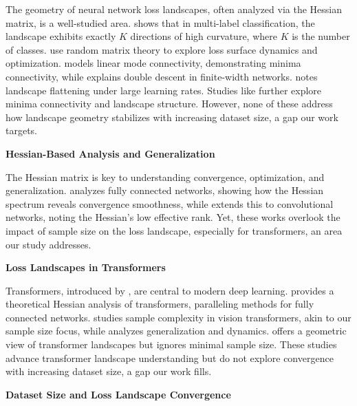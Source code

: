 \documentclass{article}
\begin{document}
The geometry of neural network loss landscapes, often analyzed via the Hessian matrix, is a well-studied area. \cite{fort2019emergentpropertieslocalgeometry} shows that in multi-label classification, the landscape exhibits exactly $K$ directions of high curvature, where $K$ is the number of classes. \cite{pmlr-v70-pennington17a} use random matrix theory to explore loss surface dynamics and optimization. \cite{garipov2018losssurfacesmodeconnectivity} models linear mode connectivity, demonstrating minima connectivity, while \cite{singh2022phenomenologydoubledescentfinitewidth} explains double descent in finite-width networks. \cite{wang2023instabilitieslargelearningrate} notes landscape flattening under large learning rates. Studies like \cite{draxler2019essentiallynobarriers, garipov2018losssurfacesmodeconnectivity, nguyen2017losssurfacedeepwide} further explore minima connectivity and landscape structure. However, none of these address how landscape geometry stabilizes with increasing dataset size, a gap our work targets.

\textbf{Hessian-Based Analysis and Generalization}

The Hessian matrix is key to understanding convergence, optimization, and generalization. \cite{kiselev2024unraveling} analyzes fully connected networks, showing how the Hessian spectrum reveals convergence smoothness, while \cite{meshkov2024convnets} extends this to convolutional networks, noting the Hessian’s low effective rank. Yet, these works overlook the impact of sample size on the loss landscape, especially for transformers, an area our study addresses.

\textbf{Loss Landscapes in Transformers}

Transformers, introduced by \cite{vaswani2017attention}, are central to modern deep learning. \cite{ormaniec2024attentionhessian} provides a theoretical Hessian analysis of transformers, paralleling methods for fully connected networks. \cite{li2023theoreticalunderstandingshallowvision} studies sample complexity in vision transformers, akin to our sample size focus, while \cite{zhang2025understandinggeneralizationtransformers} analyzes generalization and dynamics. \cite{anonymous2024stagewisedevelopmenttransformers} offers a geometric view of transformer landscapes but ignores minimal sample size. These studies advance transformer landscape understanding but do not explore convergence with increasing dataset size, a gap our work fills.

\textbf{Dataset Size and Loss Landscape Convergence}
\end{document}
